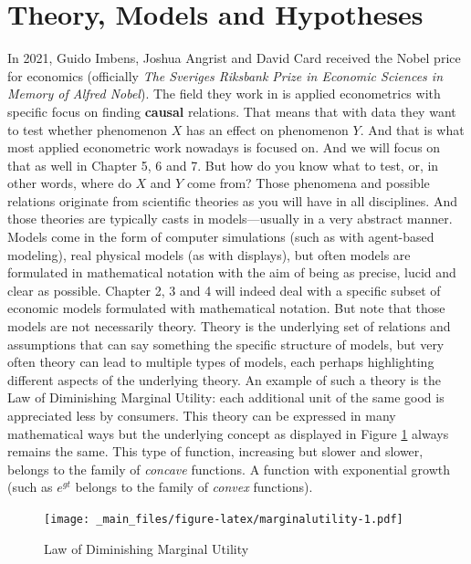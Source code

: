 \documentclass[
]{book}
\begin{document}
\hypertarget{theory-models-and-hypotheses}{%
\section{Theory, Models and Hypotheses}\label{theory-models-and-hypotheses}}

In 2021, Guido Imbens, Joshua Angrist and David Card received the Nobel price for economics (officially \emph{The Sveriges Riksbank Prize in Economic Sciences in Memory of Alfred Nobel}). The field they work in is applied econometrics with specific focus on finding \textbf{causal} relations. That means that with data they want to test whether phenomenon \(X\) has an effect on phenomenon \(Y\). And that is what most applied econometric work nowadays is focused on. And we will focus on that as well in Chapter 5, 6 and 7. But how do you know what to test, or, in other words, where do \(X\) and \(Y\) come from? Those phenomena and possible relations originate from scientific theories as you will have in all disciplines. And those theories are typically casts in models---usually in a very abstract manner. Models come in the form of computer simulations (such as with agent-based modeling), real physical models (as with displays), but often models are formulated in mathematical notation with the aim of being as precise, lucid and clear as possible. Chapter 2, 3 and 4 will indeed deal with a specific subset of economic models formulated with mathematical notation. But note that those models are not necessarily theory. Theory is the underlying set of relations and assumptions that can say something the specific structure of models, but very often theory can lead to multiple types of models, each perhaps highlighting different aspects of the underlying theory. An example of such a theory is the Law of Diminishing Marginal Utility: each additional unit of the same good is appreciated less by consumers. This theory can be expressed in many mathematical ways but the underlying concept as displayed in Figure \ref{fig:marginalutility} always remains the same. This type of function, increasing but slower and slower, belongs to the family of \emph{concave} functions. A function with exponential growth (such as \(e^{gt}\) belongs to the family of \emph{convex} functions).

\begin{figure}
\centering
\texttt{[image: \_main\_files/figure-latex/marginalutility-1.pdf]}
\caption{\label{fig:marginalutility}Law of Diminishing Marginal Utility}
\end{figure}
\end{document}
